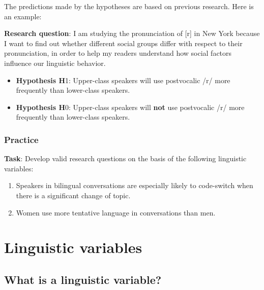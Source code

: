 \documentclass[
  11pt,
  letterpaper,
  DIV=11,
  numbers=noendperiod]{scrreprt}
\begin{document}
The predictions made by the hypotheses are based on previous research.
Here is an example:

\textbf{Research question}: I am studying the pronunciation of {[}r{]}
in New York because I want to find out whether different social groups
differ with respect to their pronunciation, in order to help my readers
understand how social factors influence our linguistic behavior.

\begin{itemize}
\item
  \textbf{Hypothesis H}1: Upper-class speakers will use postvocalic /r/
  more frequently than lower-class speakers.
\item
  \textbf{Hypothesis H}0: Upper-class speakers will \textbf{not} use
  postvocalic /r/ more frequently than lower-class speakers.
\end{itemize}

\subsection{Practice}\label{practice}

\textbf{Task}: Develop valid research questions on the basis of the
following linguistic variables:

\begin{enumerate}
\def\labelenumi{\arabic{enumi}.}
\item
  Speakers in bilingual conversations are especially likely to
  code-switch when there is a significant change of topic.
\item
  Women use more tentative language in conversations than men.
\end{enumerate}

\chapter{Linguistic variables}\label{linguistic-variables}

\section{What is a linguistic
variable?}\label{what-is-a-linguistic-variable}
\end{document}
